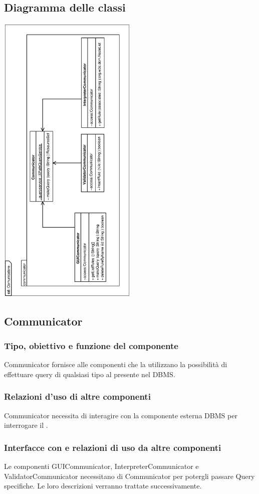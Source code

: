 \documentclass[11pt,titlepage,a4paper]{report}
\begin{document}
\subsection{Diagramma delle classi}
\begin{center}
\includegraphics[width=0.5\textwidth, angle=-90]{DiagrammaClassi/Comunicatore.eps}
\end{center}
\subsection{Communicator}
\subsubsection{Tipo, obiettivo e funzione del componente}
Communicator fornisce alle componenti che la utilizzano la possibilit\`a di effettuare query di qualsiasi tipo al \re presente nel DBMS.
\subsubsection{Relazioni d'uso di altre componenti}
Communicator necessita di interagire con la componente esterna DBMS per interrogare il \re.
\subsubsection{Interfacce con e relazioni di uso da altre componenti}
Le componenti GUICommunicator, InterpreterCommunicator e ValidatorCommunicator necessitano di Communicator per potergli passare Query specifiche. Le loro descrizioni verranno trattate successivamente.
\end{document}
